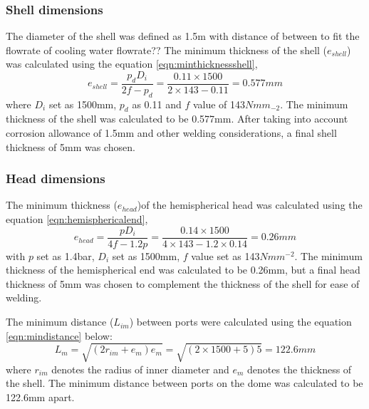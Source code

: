 \subsubsection{Shell dimensions}
The diameter of the shell was defined as 1.5m with distance of between to fit the flowrate of cooling water flowrate??
The minimum thickness of the shell ($e_{shell}$) was calculated using the equation \ref{eqn:minthicknessshell},
\begin{equation}
    e_{shell} = \frac{p_dD_i}{2f-p_d} = \frac{0.11 \times 1500}{2 \times 143 - 0.11} = 0.577mm
    \label{eqn:minthicknessshell}
\end{equation}
where $D_i$ set as 1500mm, $p_d$ as 0.11 and $f$ value of 143$Nmm_{-2}$. The minimum thickness of the shell was calculated to be 0.577mm. After taking into account corrosion allowance of 1.5mm and other welding considerations, a final shell thickness of 5mm was chosen. 

\subsubsection{Head dimensions}
The minimum thickness ($e_{head}$)of the hemispherical head was calculated using the equation \ref{eqn:hemisphericalend},
\begin{equation}
    e_{head} = \frac{pD_i}{4f-1.2p} = \frac{0.14 \times 1500}{4 \times 143 - 1.2 \times 0.14} = 0.26mm
    \label{eqn:hemisphericalend}
\end{equation}
with $p$ set as 1.4bar, $D_i$ set as 1500mm, $f$ value set as 143$Nmm^{-2}$.  The minimum thickness of the hemispherical end was calculated to be 0.26mm, but a final head thickness of 5mm was chosen to complement the thickness of the shell for ease of welding. 

The minimum distance ($L_{im}$) between ports were calculated using the equation \ref{eqn:mindistance} below:
\begin{equation}
    L_m = \sqrt{(2r_{im}+e_{m})e_m} = \sqrt{(2 \times 1500 + 5)5} = 122.6mm
    \label{eqn:mindistance}
\end{equation}
where $r_{im}$ denotes the radius of inner diameter and $e_m$ denotes the thickness of the shell. The minimum distance between ports on the dome was calculated to be 122.6mm apart. 

